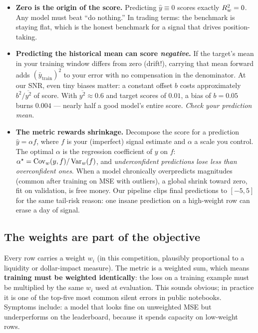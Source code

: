 \begin{itemize}
\item \textbf{Zero is the origin of the score.} Predicting $\hat y \equiv 0$
  scores exactly $R^2_{w} = 0$. Any model must beat ``do nothing.'' In trading
  terms: the benchmark is staying flat, which is the honest benchmark for a
  signal that drives position-taking.
\item \textbf{Predicting the historical mean can score \emph{negative}.}
  If the target's mean in your training window differs from zero (drift!),
  carrying that mean forward adds $(\bar y_{\text{train}})^2$ to your error
  with no compensation in the denominator. At our SNR, even tiny biases
  matter: a constant offset $b$ costs approximately $b^2 / \overline{y^2}$
  of score. With $\overline{y^2} \approx 0.6$ and target scores of $0.01$,
  a bias of $b = 0.05$ burns $0.004$ --- nearly half a good model's entire
  score. \emph{Check your prediction mean.}
\item \textbf{The metric rewards shrinkage.} Decompose the score for a
  prediction $\hat y = \alpha f$, where $f$ is your (imperfect) signal
  estimate and $\alpha$ a scale you control. The optimal $\alpha$ is the
  regression coefficient of $y$ on $f$:
  $\alpha^\star = \operatorname{Cov}_w(y, f)/\operatorname{Var}_w(f)$, and \emph{underconfident
  predictions lose less than overconfident ones}. When a model chronically
  overpredicts magnitudes (common after training on MSE with outliers),
  a global shrink toward zero, fit on validation, is free money. Our
  pipeline clips final predictions to $[-5, 5]$ for the same tail-risk
  reason: one insane prediction on a high-weight row can erase a day of
  signal.
\end{itemize}

\subsection{The weights are part of the objective}

Every row carries a weight $w_i$ (in this competition, plausibly
proportional to a liquidity or dollar-impact measure). The metric is a
weighted sum, which means \textbf{training must be weighted identically}:
the loss on a training example must be multiplied by the same $w_i$ used at
evaluation. This sounds obvious; in practice it is one of the top-five most
common silent errors in public notebooks. Symptoms include: a model that
looks fine on unweighted MSE but underperforms on the leaderboard, because
it spends capacity on low-weight rows.

